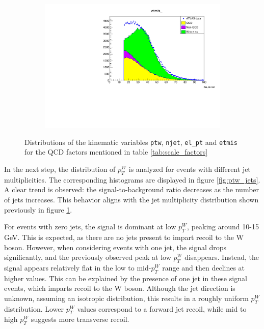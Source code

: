 \begin{figure}
\begin{subfigure}{0.5\textwidth}
        \end{subfigure}
        \begin{subfigure}{0.5\textwidth}
            \includegraphics[width=\textwidth]{../W_mass/etmis_100_0_100_qcd0-3.pdf}
        \end{subfigure}
        \caption{Distributions of the kinematic variables \texttt{ptw}, \texttt{njet}, \texttt{el\_pt} and \texttt{etmis} for the QCD factors mentioned in table \ref{tab:scale_factors}}
        \label{fig:qcd-final}
    \end{figure}
    In the next step, the distribution of $p_T^W$ is analyzed for events with different jet multiplicities. The corresponding histograms are displayed in figure \ref{fig:ptw_jets}.
    A clear trend is observed: the signal-to-background ratio decreases as the number of jets increases.
    This behavior aligns with the jet multiplicity distribution shown previously in figure \ref{fig:qcd-final}.

    For events with zero jets, the signal is dominant at low $p_T^W$, peaking around 10-15\,GeV. This is expected, as there are no jets present to impart recoil to the W boson.
    However, when considering events with one jet, the signal drops significantly, and the previously observed peak at low $p_T^W$ disappears.
    Instead, the signal appears relatively flat in the low to mid-$p_T^W$ range and then declines at higher values.
    This can be explained by the presence of one jet in these signal events, which imparts recoil to the W boson.
    Although the jet direction is unknown, assuming an isotropic distribution, this results in a roughly uniform $p_T^W$ distribution.
    Lower $p_T^W$ values correspond to a forward jet recoil, while mid to high $p_T^W$ suggests more transverse recoil.

